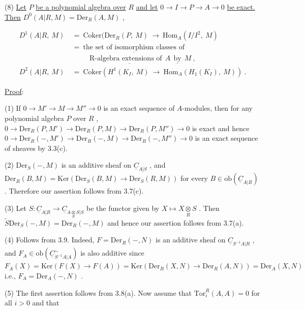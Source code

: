 (8) \underline{Let}  $P$  \underline{be a polynomial algebra over}  $R$  \underline{and let}  $0 \to I \to P \to A \to 0$ \underline{be exact. Then}  $D^0(A|R, M) = \mathrm{Der}_R(A, M)$  ,

\begin{equation*}
\begin{aligned}
D^1(A|R, \ M) \ &= \ \mathrm{Coker}(\mathrm{Der}_R(P, \ M) \ \to \ \mathrm{Hom}_A(I/I^2, \ M)\\
&= \ \underline{\text{the set of isomorphism classes of}}\\
&\qquad\ \ \text{R-}\underline{\text{algebra extensions of}} \ \ A \ \ \underline{\text{by}} \ \ M \ ,\\
D^2(A|R, \ M) \ &= \ \mathrm{Coker}(H^1(K_I, \ M) \ \to \ \mathrm{Hom}_A(H_1(K_I), \ M)) \ .
\end{aligned}
\end{equation*}

\underline{Proof}:

(1) If  $0 \to M' \to M \to M'' \to 0$  is an exact sequence of $A$-modules, then for any polynomial algebra  $P$  over  $R$  ,  $0 \to \mathrm{Der}_R(P, M') \to \mathrm{Der}_R(P, M) \to \mathrm{Der}_R(P, M'') \to 0$ is exact and hence  $0 \to \mathrm{Der}_R(-, M') \to \mathrm{Der}_R(-, M) \to \mathrm{Der}_R(-, M'') \to 0$  is an exact sequence of sheaves by 3.3(c).

(2) $\mathrm{Der}_S(-, M)$  is an additive sheaf on  $\underline{C}_{A|S}$  , and $\mathrm{Der}_R(B, M) = \mathrm{Ker}(\mathrm{Der}_S(B, M) \to \mathrm{Der}_S(R, M))$  for every  $B \in \mathrm{ob}(\underline{C}_{A|R})$  . Therefore our assertion follows from 3.7(c).

(3) Let  $S : \underline{C}_{A|R} \to \underline{C}_{A \underset{R}{\otimes} S|S}$  be the functor given by  $X \longmapsto X \underset{R}{\otimes} S$  . Then $\widetilde{S}\mathrm{Der}_S(-, M) = \mathrm{Der}_R(-, M)$  and hence our assertion follows from 3.7(a).


(4)  Follows from 3.9. Indeed,  $F = \mathrm{Der}_R(-, N)$  is an additive sheaf on $\underline{C}_{S^{-1}A|R}$  , and  $F_A \in \mathrm{ob}\left(\underline{C}^{\sim}_{S^{-1}A|A}\right)$  is also additive since $F_A(X) = \mathrm{Ker}(F(X) \to F(A)) = \mathrm{Ker}(\mathrm{Der}_R(X, N) \to \mathrm{Der}_R(A, N)) = \mathrm{Der}_A(X, N)$  i.e., $F_A = \mathrm{Der}_A(-, N)$  .

(5)  The first assertion follows from 3.8(a). Now assume that $\mathrm{Tor}^R_i(A, A) = 0$  for all  $i > 0$  and that

